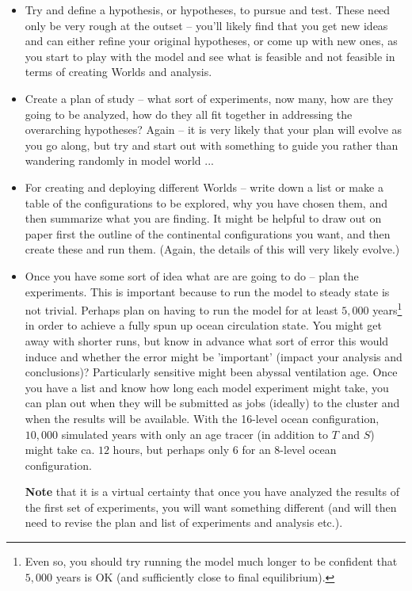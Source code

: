 \vspace{2mm}
\begin{itemize}[noitemsep]
\vspace{1mm}
\item Try and define a hypothesis, or hypotheses, to pursue and test. These need only be very rough at the outset -- you'll likely find that you get new ideas and can either refine your original hypotheses, or come up with new ones, as you start to play with the model and see what is feasible and not feasible in terms of creating Worlds and analysis.
\vspace{1mm}
\item Create a plan of study -- what sort of experiments, now many, how are they going to be analyzed, how do they all fit together in addressing the overarching hypotheses? Again -- it is very likely that your plan will evolve as you go along, but try and start out with something to guide you rather than wandering randomly in model world ...
\vspace{1mm}
\item For creating and deploying different Worlds -- write down a list or make a table of the configurations to be explored, why you have chosen them, and then summarize what you are finding. It might be helpful to draw out on paper first the outline of the continental configurations you want, and then create these and run them. (Again, the details of this will very likely evolve.)
\vspace{1mm}
\item Once you have some sort of idea what are are going to do -- plan the experiments. This is important because to run the model to steady state is not trivial. Perhaps plan on having to run the model for at least $5,000$ years\footnote{Even so, you should try running the model much longer to be confident that $5,000$ years is OK (and sufficiently close to final equilibrium).} in order to achieve a fully spun up ocean circulation state. You might get away with shorter runs, but know in advance what sort of error this would induce and whether the error might be 'important' (impact your analysis and conclusions)? Particularly sensitive might been abyssal ventilation age.
Once you have a list and know how long each model experiment might take, you can plan out when they will be submitted as jobs (ideally) to the cluster and when the results will be available. With the 16-level ocean configuration, $10,000$ simulated years with only an age tracer (in addition to $T$ and $S$) might take ca. $12$ hours, but perhaps only $6$ for an 8-level ocean configuration.

\textbf{Note} that it is a virtual certainty that once you have analyzed the results of the first set of experiments, you will want something different (and will then need to revise the plan and list of experiments and analysis etc.).
\end{itemize}
\vspace{2mm}


